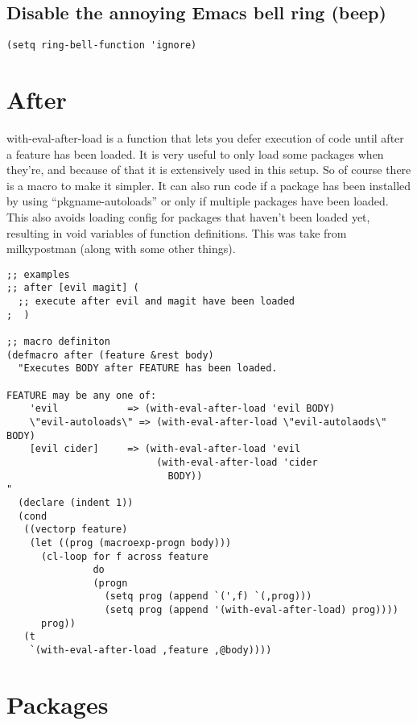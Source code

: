 \documentclass[11pt]{article}
\begin{document}
\subsection*{Disable the annoying Emacs bell ring (beep)}
\label{sec:orgefabb13}

\begin{verbatim}
(setq ring-bell-function 'ignore)
\end{verbatim}


\section*{After}
\label{sec:org25c659e}

with-eval-after-load is a function that lets you defer execution of code until after a feature has been loaded.
It is very useful to only load some packages when they’re, and because of that it is extensively used in this setup. 
So of course there is a macro to make it simpler. It can also run code if a package has been installed by using “pkgname-autoloads” or only if multiple packages have been loaded.
This also avoids loading config for packages that haven’t been loaded yet, resulting in void variables of function definitions. 
This was take from milkypostman (along with some other things).

\begin{verbatim}
;; examples
;; after [evil magit] (
  ;; execute after evil and magit have been loaded
;  )

;; macro definiton
(defmacro after (feature &rest body)
  "Executes BODY after FEATURE has been loaded.

FEATURE may be any one of:
    'evil            => (with-eval-after-load 'evil BODY)
    \"evil-autoloads\" => (with-eval-after-load \"evil-autolaods\" BODY)
    [evil cider]     => (with-eval-after-load 'evil
                          (with-eval-after-load 'cider
                            BODY))
"
  (declare (indent 1))
  (cond
   ((vectorp feature)
    (let ((prog (macroexp-progn body)))
      (cl-loop for f across feature
               do
               (progn
                 (setq prog (append `(',f) `(,prog)))
                 (setq prog (append '(with-eval-after-load) prog))))
      prog))
   (t
    `(with-eval-after-load ,feature ,@body))))
\end{verbatim}


\section*{Packages}
\label{sec:orgacf37ed}
\end{document}
